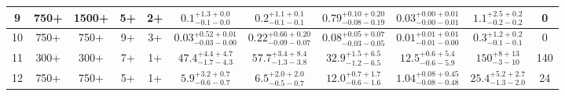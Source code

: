 \documentclass[11pt, oneside]{article}
\begin{document}
\begin{table}
{\begin{tabular}{ |c|c|c|c|c||c|c|c|c||c|c| }
9 & 750+ & 1500+ & 5+ & 2+ & $0.1^{+1.3+0.0}_{-0.1-0.0}$ & $0.2^{+1.1+0.1}_{-0.1-0.1}$ & $0.79^{+0.10+0.20}_{-0.08-0.19}$ & $0.03^{+0.00+0.01}_{-0.00-0.01}$ & $1.1^{+2.5+0.2}_{-0.2-0.2}$ & 0 \\ \hline
10 & 750+ & 750+ & 9+ & 3+ & $0.03^{+0.52+0.01}_{-0.03-0.00}$ & $0.22^{+0.66+0.20}_{-0.09-0.07}$ & $0.08^{+0.05+0.07}_{-0.03-0.05}$ & $0.01^{+0.01+0.01}_{-0.01-0.00}$ & $0.3^{+1.2+0.2}_{-0.1-0.1}$ & 0 \\ \hline
11 & 300+ & 300+ & 7+ & 1+ & $47.4^{+4.4+4.7}_{-1.7-4.3}$ & $57.7^{+3.4+8.4}_{-1.3-3.8}$ & $32.9^{+1.5+6.5}_{-1.2-6.5}$ & $12.5^{+0.6+5.4}_{-0.6-5.9}$ & $150^{+ 8+13}_{- 3-10}$ & 140 \\ \hline
12 & 750+ & 750+ & 5+ & 1+ & $5.9^{+3.2+0.7}_{-0.6-0.7}$ & $6.5^{+2.0+2.0}_{-0.5-0.7}$ & $12.0^{+0.7+1.7}_{-0.6-1.6}$ & $1.04^{+0.08+0.45}_{-0.08-0.48}$ & $25.4^{+5.2+2.7}_{-1.3-2.0}$ & 24 \\ \hline
\end{tabular}}
\end{table}
\end{document}
